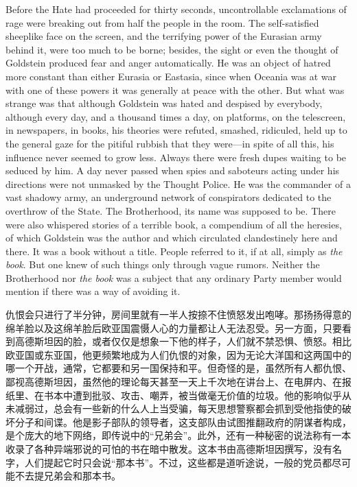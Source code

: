 \begin{paracol}{2}
\switchcolumn*

Before the Hate had proceeded for thirty seconds, uncontrollable
exclamations of rage were breaking out from half the people in the room.
The self-satisfied sheeplike face on the screen, and the terrifying
power of the Eurasian army behind it, were too much to be borne;
besides, the sight or even the thought of Goldstein produced fear and
anger automatically. He was an object of hatred more constant than
either Eurasia or Eastasia, since when Oceania was at war with one of
these powers it was generally at peace with the other. But what was
strange was that although Goldstein was hated and despised by everybody,
although every day, and a thousand times a day, on platforms, on the
telescreen, in newspapers, in books, his theories were refuted, smashed,
ridiculed, held up to the general gaze for the pitiful rubbish that they
were---in spite of all this, his influence never seemed to grow less.
Always there were fresh dupes waiting to be seduced by him. A day never
passed when spies and saboteurs acting under his directions were not
unmasked by the Thought Police. He was the commander of a vast shadowy
army, an underground network of conspirators dedicated to the overthrow
of the State. The Brotherhood, its name was supposed to be. There were
also whispered stories of a terrible book, a compendium of all the
heresies, of which Goldstein was the author and which circulated
clandestinely here and there. It was a book without a title. People
referred to it, if at all, simply as \emph{the book}. But one knew of
such things only through vague rumors. Neither the Brotherhood nor
\emph{the book} was a subject that any ordinary Party member would
mention if there was a way of avoiding it.

\switchcolumn

仇恨会只进行了半分钟，房间里就有一半人按捺不住愤怒发出咆哮。那扬扬得意的绵羊脸以及这绵羊脸后欧亚国震慑人心的力量都让人无法忍受。另一方面，只要看到高德斯坦因的脸，或者仅仅是想象一下他的样子，人们就不禁恐惧、愤怒。相比欧亚国或东亚国，他更频繁地成为人们仇恨的对象，因为无论大洋国和这两国中的哪一个开战，通常，它都要和另一国保持和平。但奇怪的是，虽然所有人都仇恨、鄙视高德斯坦因，虽然他的理论每天甚至一天上千次地在讲台上、在电屏内、在报纸里、在书本中遭到批驳、攻击、嘲弄，被当做毫无价值的垃圾。他的影响似乎从未减弱过，总会有一些新的什么人上当受骗，每天思想警察都会抓到受他指使的破坏分子和间谍。他是影子部队的领导者，这支部队由试图推翻政府的阴谋者构成，是个庞大的地下网络，即传说中的``兄弟会''。此外，还有一种秘密的说法称有一本收录了各种异端邪说的可怕的书在暗中散发。这本书由高德斯坦因撰写，没有名字，人们提起它时只会说``那本书''。不过，这些都是道听途说，一般的党员都尽可能不去提兄弟会和那本书。


\end{paracol}
